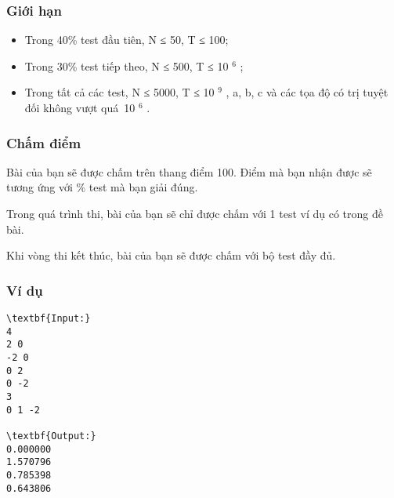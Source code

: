 \subsubsection{   Giới hạn  }
\begin{itemize}
	\item     Trong 40\% test đầu tiên, N ≤ 50, T ≤ 100;   
	\item     Trong 30\% test tiếp theo, N ≤ 500, T ≤ 10    $^     6    $    ;   
	\item     Trong tất cả các test, N ≤ 5000, T ≤ 10    $^     9    $    , a, b, c và các tọa độ có trị tuyệt đối không vượt quá 10    $^     6    $    .   
\end{itemize}

\subsubsection{   Chấm điểm  }

   Bài của bạn sẽ được chấm trên thang điểm 100. Điểm mà bạn nhận được sẽ tương ứng với \% test mà bạn giải đúng.  

   Trong quá trình thi, bài của bạn sẽ chỉ được chấm với 1 test ví dụ có trong đề bài.  

   Khi vòng thi kết thúc, bài của bạn sẽ được chấm với bộ test đầy đủ.  
\begin{itemize}
\end{itemize}

\subsubsection{   Ví dụ  }
\begin{verbatim}
\textbf{Input:}
4
2 0
-2 0
0 2
0 -2
3
0 1 -2

\textbf{Output:}
0.000000
1.570796
0.785398
0.643806
\end{verbatim}